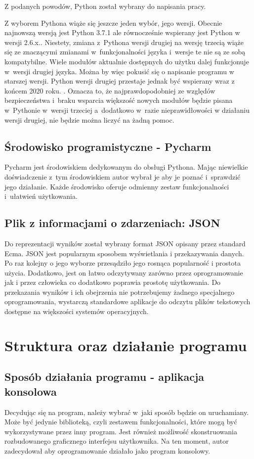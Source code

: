 \documentclass[eng,printmode]{mgr}
\begin{document}
Z podanych powodów, Python został wybrany do napisania pracy.

Z wyborem Pythona wiąże się jeszcze jeden wybór, jego wersji. Obecnie najnowszą wersją jest Python 3.7.1 ale równocześnie wspierany jest Python w wersji 2.6.x.\cite{Python_latest_release}. Niestety, zmiana z~Pythona wersji drugiej na wersję trzecią wiąże się ze znaczącymi zmianami w~funkcjonalności języka i~wersje te nie są ze sobą kompatybilne. Wiele modułów aktualnie dostępnych do użytku dalej funkcjonuje w~wersji drugiej języka. Można by więc pokusić się o napisanie programu w starszej wersji. Python wersji drugiej przestaje jednak być wspierany wraz z końcem 2020 roku. \cite{Python_end_of_life}. Oznacza to, że najprawdopodobniej ze względów bezpieczeństwa i~braku wsparcia większość nowych modułów będzie pisana w~Pythonie w~wersji trzeciej a~dodatkowo w~razie nieprawidłowości w działaniu wersji drugiej, nie będzie można liczyć na żadną pomoc.


\section{Środowisko programistyczne - Pycharm}
Pycharm jest środowiskiem dedykowanym do obsługi Pythona. Mając niewielkie doświadczenie z~tym środowiskiem autor wybrał je aby je poznać i~sprawdzić jego działanie. Każde środowisko oferuje odmienny zestaw funkcjonalności i~ułatwień użytkowania.

\section{Plik z informacjami o zdarzeniach: JSON}
Do reprezentacji wyników został wybrany format JSON opisany przez standard Ecma\cite{JSON}. JSON jest popularnym sposobem wyświetlania i przekazywania danych. Po raz kolejny o jego wyborze przesądziło jego rosnąca popularność i prostota użycia\cite{JSON_popular}. Dodatkowo, jest on łatwo odczytywany zarówno przez oprogramowanie jak i przez człowieka co dodatkowo poprawia prostotę użytkowania. Do przekazania wyników i ich obejrzenia nie potrzebujemy żadnego specjalnego oprogramowania, wystarczą standardowe aplikacje do odczytu plików tekstowych dostępne na większości systemów operacyjnych.
\chapter{Struktura oraz działanie programu}
\section{Sposób działania programu - aplikacja konsolowa}
Decydując się na program, należy wybrać w~jaki sposób będzie on uruchamiany. Może być jedynie biblioteką, czyli zestawem funkcjonalności, które mogą być wykorzystywane przez inny program. Jest również możliwość skonstruowania rozbudowanego graficznego interfejsu użytkownika. Na ten moment, autor zadecydował aby oprogramowanie działało jako program konsolowy. 
\end{document}
